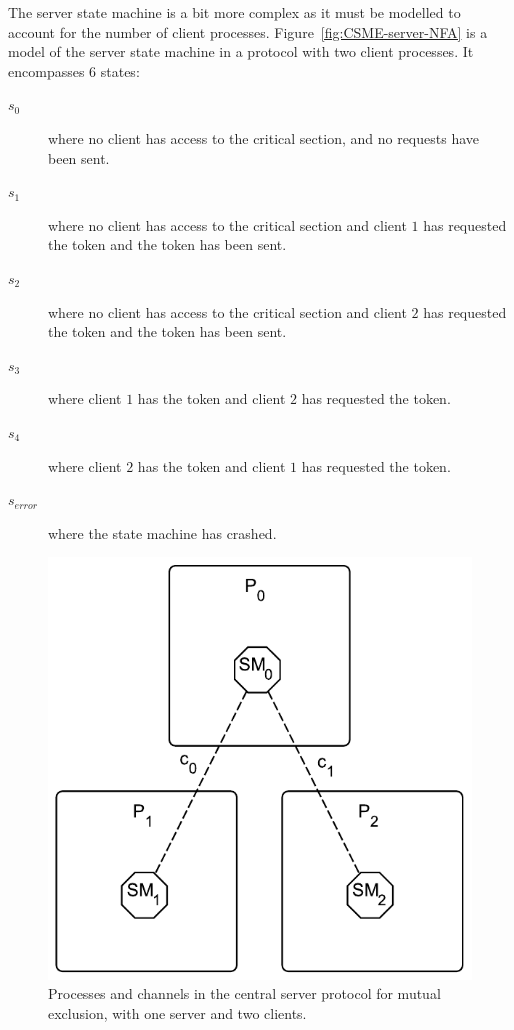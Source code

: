 \documentclass{article}
\begin{document}
		The server state machine is a bit more complex as it must be modelled to account for the number of client processes.
		Figure~\ref{fig:CSME-server-NFA} is a model of the server state machine in a protocol with two client processes.
		It encompasses 6 states:
		\begin{description}
			\item[$s_0$] where no client has access to the critical section, and no requests have been sent.
			\item[$s_1$] where no client has access to the critical section and client $1$ has requested the token and the token has been sent.
			\item[$s_2$] where no client has access to the critical section and client $2$ has requested the token and the token has been sent.
			\item[$s_3$] where client $1$ has the token and client $2$ has requested the token.
			\item[$s_4$] where client $2$ has the token and client $1$ has requested the token.
			\item[$s_{error}$] where the state machine has crashed.
		\end{description}

		\begin{figure}[ht]
			\center
			\includegraphics[scale=0.6]{figures/state-machines/CSME-protocol.pdf}
			\caption{Processes and channels in the central server protocol for mutual exclusion, with one server and two clients.}
			\label{fig:CSME-protocol}
		\end{figure}
		\FloatBarrier
\end{document}
